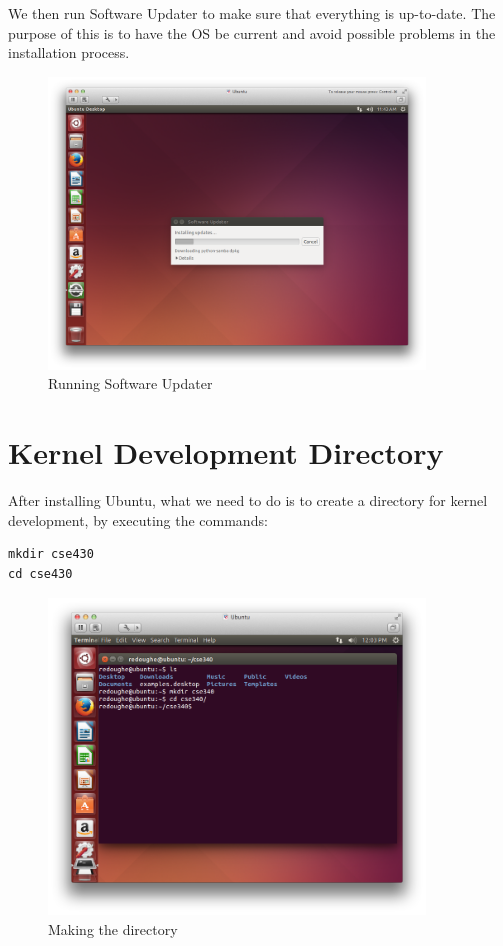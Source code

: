 \documentclass[12pt]{article}
\newcommand{\imagesize}{100mm}
\begin{document}
\newpage

We then run Software Updater to make sure that everything is up-to-date. The purpose of this is to have the OS be current and avoid possible problems in the installation process.

\begin{figure}
\centering
\includegraphics[width=\imagesize]{3.jpg}
\caption{Running Software Updater}
\end{figure}

\newpage 

\section{Kernel Development Directory}

After installing Ubuntu, what we need to do is to create a directory for kernel development, by executing the commands:
\begin{verbatim}
mkdir cse430
cd cse430
\end{verbatim}

\begin{figure}
\centering
\includegraphics[width=\imagesize]{4.jpg}
\caption{Making the directory}
\end{figure}
\end{document}
